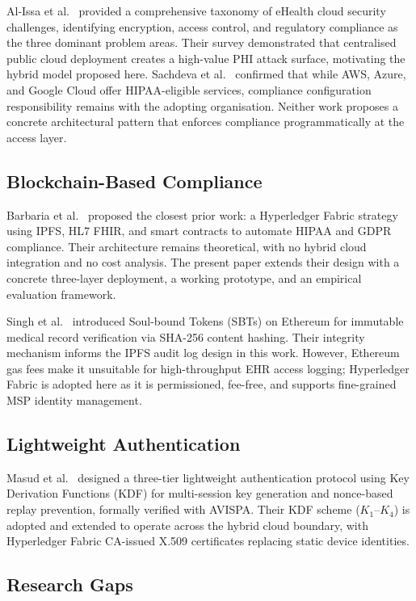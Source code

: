 \documentclass[10pt,twocolumn,a4paper]{article}
\begin{document}
Al-Issa et al.~\cite{alissa2019} provided a comprehensive taxonomy of
eHealth cloud security challenges, identifying encryption, access
control, and regulatory compliance as the three dominant problem areas.
Their survey demonstrated that centralised public cloud deployment
creates a high-value PHI attack surface, motivating the hybrid model
proposed here. Sachdeva et al.~\cite{sachdeva2024} confirmed that while
AWS, Azure, and Google Cloud offer HIPAA-eligible services, compliance
configuration responsibility remains with the adopting organisation.
Neither work proposes a concrete architectural pattern that enforces
compliance programmatically at the access layer.

\subsection{Blockchain-Based Compliance}

Barbaria et al.~\cite{barbaria2025} proposed the closest prior work:
a Hyperledger Fabric strategy using IPFS, HL7 FHIR, and smart contracts
to automate HIPAA and GDPR compliance. Their architecture remains
theoretical, with no hybrid cloud integration and no cost analysis. The
present paper extends their design with a concrete three-layer
deployment, a working prototype, and an empirical evaluation framework.

Singh et al.~\cite{singh2024} introduced Soul-bound Tokens (SBTs) on
Ethereum for immutable medical record verification via SHA-256 content
hashing. Their integrity mechanism informs the IPFS audit log design in
this work. However, Ethereum gas fees make it unsuitable for
high-throughput EHR access logging; Hyperledger Fabric is adopted here
as it is permissioned, fee-free, and supports fine-grained MSP identity
management.

\subsection{Lightweight Authentication}

Masud et al.~\cite{masud2021} designed a three-tier lightweight
authentication protocol using Key Derivation Functions (KDF) for
multi-session key generation and nonce-based replay prevention, formally
verified with AVISPA. Their KDF scheme ($K_1$--$K_4$) is adopted and
extended to operate across the hybrid cloud boundary, with Hyperledger
Fabric CA-issued X.509 certificates replacing static device identities.

\subsection{Research Gaps}
\end{document}
